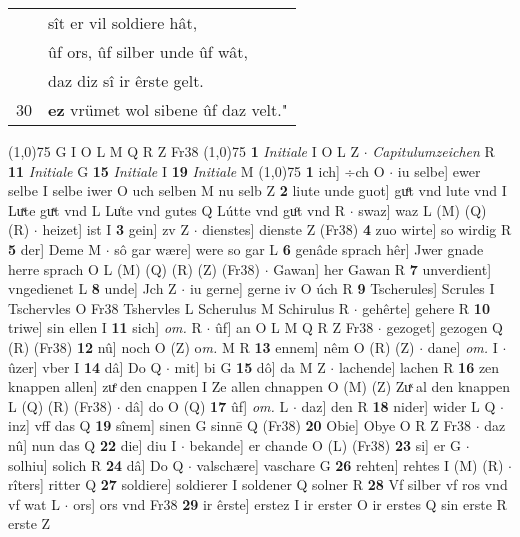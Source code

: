 \documentclass[8pt,a4paper,notitlepage]{article}
\begin{document}
\begin{table}[ht]
\begin{minipage}[t]{0.5\linewidth}
\begin{tabular}{rl}
 & sît er vil soldiere hât,\\ 
 & ûf ors, ûf silber unde ûf wât,\\ 
 & daz diz sî ir êrste gelt.\\ 
30 & \textbf{ez} vrümet wol sibene ûf daz velt."\\ 
\end{tabular}
\scriptsize
\line(1,0){75} \newline
G I O L M Q R Z Fr38 \newline
\line(1,0){75} \newline
\textbf{1} \textit{Initiale} I O L Z   $\cdot$ \textit{Capitulumzeichen} R  \textbf{11} \textit{Initiale} G  \textbf{15} \textit{Initiale} I  \textbf{19} \textit{Initiale} M  \newline
\line(1,0){75} \newline
\textbf{1} ich] ÷ch O  $\cdot$ iu selbe] ewer selbe I selbe iwer O uch selben M nu selb Z \textbf{2} liute unde guot] guͤt vnd lute vnd I Luͯte guͯt vnd L Lu͑te vnd gutes Q Lútte vnd guͦt vnd R  $\cdot$ swaz] waz L (M) (Q) (R)  $\cdot$ heizet] ist I \textbf{3} gein] zv Z  $\cdot$ dienstes] dienste Z (Fr38) \textbf{4} zuo wirte] so wirdig R \textbf{5} der] Deme M  $\cdot$ sô gar wære] were so gar L \textbf{6} genâde sprach hêr] Jwer gnade herre sprach O L (M) (Q) (R) (Z) (Fr38)  $\cdot$ Gawan] her Gawan R \textbf{7} unverdient] vngedienet L \textbf{8} unde] Jch Z  $\cdot$ iu gerne] gerne iv O úch R \textbf{9} Tscherules] Scrules I Tschervles O Fr38 Tshervles L Scherulus M Schirulus R  $\cdot$ gehêrte] gehere R \textbf{10} triwe] sin ellen I \textbf{11} sich] \textit{om.} R  $\cdot$ ûf] an O L M Q R Z Fr38  $\cdot$ gezoget] gezogen Q (R) (Fr38) \textbf{12} nû] noch O (Z) o\textit{m. } M R \textbf{13} ennem] nêm O (R) (Z)  $\cdot$ dane] \textit{om.} I  $\cdot$ ûzer] vber I \textbf{14} dâ] Do Q  $\cdot$ mit] bi G \textbf{15} dô] da M Z  $\cdot$ lachende] lachen R \textbf{16} zen knappen allen] zuͤ den cnappen I Ze allen chnappen O (M) (Z) Zuͯ al den knappen L (Q) (R) (Fr38)  $\cdot$ dâ] do O (Q) \textbf{17} ûf] \textit{om.} L  $\cdot$ daz] den R \textbf{18} nider] wider L Q  $\cdot$ inz] vff das Q \textbf{19} sînem] sinen G sinnē Q (Fr38) \textbf{20} Obie] Obye O R Z Fr38  $\cdot$ daz nû] nun das Q \textbf{22} die] diu I  $\cdot$ bekande] er chande O (L) (Fr38) \textbf{23} si] er G  $\cdot$ solhiu] solich R \textbf{24} dâ] Do Q  $\cdot$ valschære] vaschare G \textbf{26} rehten] rehtes I (M) (R)  $\cdot$ rîters] ritter Q \textbf{27} soldiere] soldierer I soldener Q solner R \textbf{28} Vf silber vf ros vnd vf wat L  $\cdot$ ors] ors vnd Fr38 \textbf{29} ir êrste] erstez I ir erster O ir erstes Q sin erste R erste Z \newline

\end{minipage}
\end{table}
\end{document}
